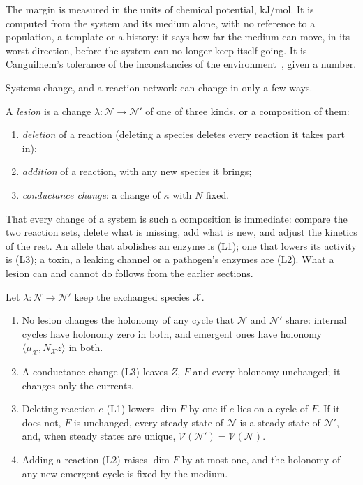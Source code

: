 The margin is measured in the units of chemical potential, kJ/mol. It is
computed from the system and its medium alone, with no reference to a
population, a template or a history: it says how far the medium can move,
in its worst direction, before the system can no longer keep itself going.
It is Canguilhem's tolerance of the inconstancies of the
environment~\citep{canguilhem1989}, given a number.

Systems change, and a reaction network can change in only a few ways.

\begin{definition}[Lesion]
\label{c1:def-lesion}
A \emph{lesion} is a change $\lambda\colon\mathcal N\to\mathcal N'$ of one of
three kinds, or a composition of them:
\begin{enumerate}[label=(L\arabic*),nosep]
\item \emph{deletion} of a reaction (deleting a species deletes every
      reaction it takes part in);
\item \emph{addition} of a reaction, with any new species it brings;
\item \emph{conductance change}: a change of $\kappa$ with $N$ fixed.
\end{enumerate}
\end{definition}

That every change of a system is such a composition is immediate: compare
the two reaction sets, delete what is missing, add what is new, and adjust
the kinetics of the rest. \lnkD{} An allele that abolishes an enzyme is
(L1); one that lowers its activity is (L3); a toxin, a leaking channel or a
pathogen's enzymes are (L2). What a lesion can and cannot do follows from
the earlier sections.

\begin{theorem}
\label{c1:thm-lesion}
\lnkD{} Let $\lambda\colon\mathcal N\to\mathcal N'$ keep the exchanged
species $\mathcal X$.
\begin{enumerate}[label=(\alph*),nosep]
\item No lesion changes the holonomy of any cycle that $\mathcal N$ and
      $\mathcal N'$ share: internal cycles have holonomy zero in both, and
      emergent ones have holonomy
      $\langle\mu_{\mathcal X},N_{\mathcal X}z\rangle$ in both.
\item A conductance change (L3) leaves $Z$, $F$ and every holonomy
      unchanged; it changes only the currents.
\item Deleting reaction $e$ (L1) lowers $\dim F$ by one if $e$ lies on a
      cycle of $F$. If it does not, $F$ is unchanged, every steady state of
      $\mathcal N$ is a steady state of $\mathcal N'$, and, when steady
      states are unique, $\mathcal V(\mathcal N')=\mathcal V(\mathcal N)$.
\item Adding a reaction (L2) raises $\dim F$ by at most one, and the
      holonomy of any new emergent cycle is fixed by the medium.
\end{enumerate}
\end{theorem}

